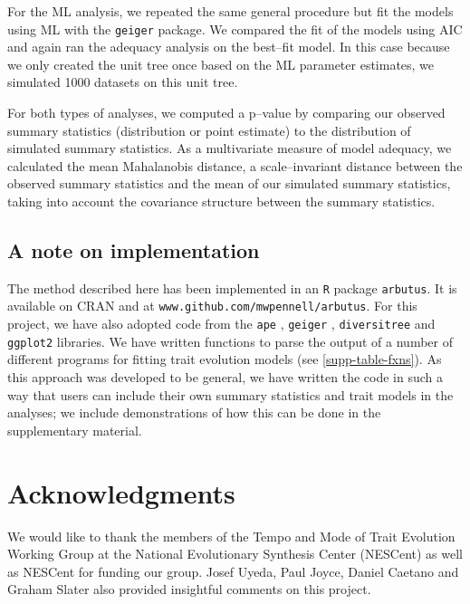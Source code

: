 \documentclass[a4paper,12pt]{article}
\begin{document}
For the ML analysis, we repeated the same general procedure but fit the models using ML with the \texttt{geiger} \citep{geiger} package. We compared the fit of the models using AIC \citep{Akaike1974} and again ran the adequacy analysis on the best--fit model. In this case because we only created the unit tree once based on the ML parameter estimates, we simulated 1000 datasets on this unit tree. 

For both types of analyses, we computed a p--value by comparing our observed summary statistics (distribution or point estimate) to the distribution of simulated summary statistics. As a multivariate measure of model adequacy, we calculated the mean Mahalanobis distance, a scale--invariant distance between the observed summary statistics and the mean of our simulated summary statistics, taking into account the covariance structure between the summary statistics.

\subsection{A note on implementation}

The method described here has been implemented in an \texttt{R} package \texttt{arbutus}. It is available on CRAN and at \texttt{www.github.com/mwpennell/arbutus}. For this project, we have also adopted code from the \texttt{ape} \citep{ape}, \texttt{geiger} \citep{geiger}, \texttt{diversitree} \citep{FitzJohn2012} and \texttt{ggplot2} \citep{ggplot2} libraries. We have written functions to parse the output of a number of different programs for fitting trait evolution models (see \ref{supp-table-fxns}). As this approach was developed to be general, we have written the code in such a way that users can include their own summary statistics and trait models in the analyses; we include demonstrations of how this can be done in the supplementary material.

\section{Acknowledgments}
We would like to thank the members of the Tempo and Mode of Trait Evolution Working Group at the National Evolutionary Synthesis Center (NESCent) as well as NESCent for funding our group. Josef Uyeda, Paul Joyce, Daniel Caetano and Graham Slater also provided insightful comments on this project.

\newpage


\end{document}
